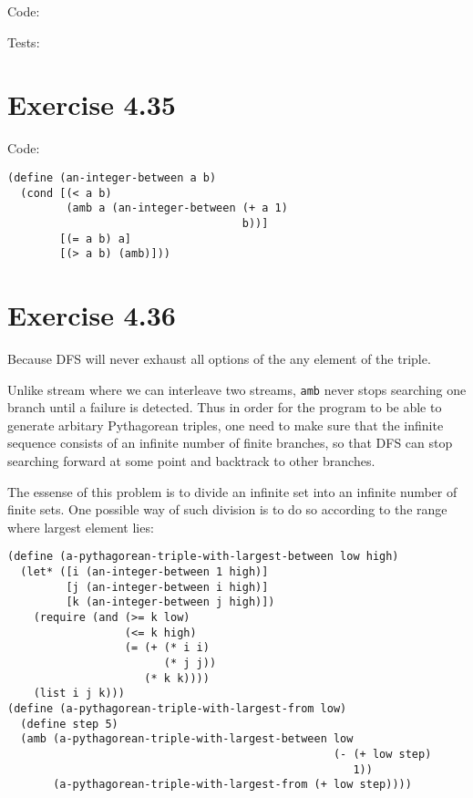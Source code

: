 \documentclass[../main.tex]{subfiles}
\begin{document}
Code:



Tests:



\section{Exercise 4.35}

Code:

\begin{lstlisting}
(define (an-integer-between a b)
  (cond [(< a b)
         (amb a (an-integer-between (+ a 1)
                                    b))]
        [(= a b) a]
        [(> a b) (amb)]))
\end{lstlisting}

\section{Exercise 4.36}

Because DFS will never exhaust all options of the any element of the triple.

Unlike stream where we can interleave two streams, \lstinline{amb} never stops searching one branch until a failure is detected. Thus in order for the program to be able to generate arbitary Pythagorean triples, one need to make sure that the infinite sequence consists of an infinite number of finite branches, so that DFS can stop searching forward at some point and backtrack to other branches.

The essense of this problem is to divide an infinite set into an infinite number of finite sets. One possible way of such division is to do so according to the range where largest element lies:

\begin{lstlisting}
(define (a-pythagorean-triple-with-largest-between low high)
  (let* ([i (an-integer-between 1 high)]
         [j (an-integer-between i high)]
         [k (an-integer-between j high)])
    (require (and (>= k low)
                  (<= k high)
                  (= (+ (* i i)
                        (* j j))
                     (* k k))))
    (list i j k)))
(define (a-pythagorean-triple-with-largest-from low)
  (define step 5)
  (amb (a-pythagorean-triple-with-largest-between low
                                                  (- (+ low step)
                                                     1))
       (a-pythagorean-triple-with-largest-from (+ low step))))
\end{lstlisting}
\end{document}
